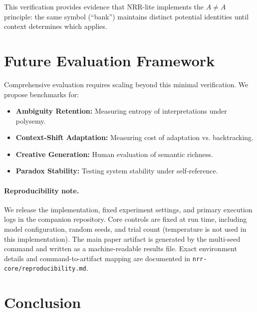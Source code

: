 \documentclass[11pt,a4paper]{article}
\begin{document}
This verification provides evidence that NRR-lite implements the $A \neq A$ principle: the same symbol (``bank'') maintains distinct potential identities until context determines which applies.

\section{Future Evaluation Framework}

Comprehensive evaluation requires scaling beyond this minimal verification.
We propose benchmarks for:
\begin{itemize}
    \item \textbf{Ambiguity Retention:} Measuring entropy of interpretations under polysemy.
    \item \textbf{Context-Shift Adaptation:} Measuring cost of adaptation vs. backtracking.
    \item \textbf{Creative Generation:} Human evaluation of semantic richness.
    \item \textbf{Paradox Stability:} Testing system stability under self-reference.
\end{itemize}

\paragraph{Reproducibility note.}
We release the implementation, fixed experiment settings, and primary execution logs in the companion repository.
Core controls are fixed at run time, including model configuration, random seeds, and trial count (temperature is not used in this implementation).
The main paper artifact is generated by the multi-seed command and written as a machine-readable results file.
Exact environment details and command-to-artifact mapping are documented in \texttt{nrr-core/reproducibility.md}.

\section{Conclusion}
\end{document}
